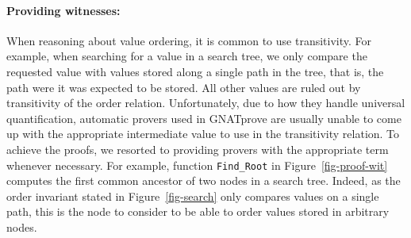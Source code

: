 \documentclass{llncs}
\newcommand{\gnatprove}{GNATprove\xspace}
\begin{document}
\paragraph{Providing witnesses:}
When reasoning about value ordering, it is common to use transitivity. For example, when searching for
a value in a search tree, we only compare the requested value with values stored along a single path in
the tree, that is, the path were it was expected to be stored. All other values are ruled out by
transitivity of the order relation. Unfortunately, due to how they handle universal quantification,
automatic provers used in \gnatprove are usually unable to come up with the appropriate
intermediate value to use in the transitivity relation. To achieve the proofs, we resorted to providing
provers with the appropriate term whenever necessary. For example, function \texttt{Find\_Root} in
Figure~\ref{fig-proof-wit} computes the first common ancestor of two nodes in a search tree. Indeed, as
the order invariant stated in Figure~\ref{fig-search} only compares values on a single path, this
is the node to consider to be able to order values stored in arbitrary nodes.
\end{document}
